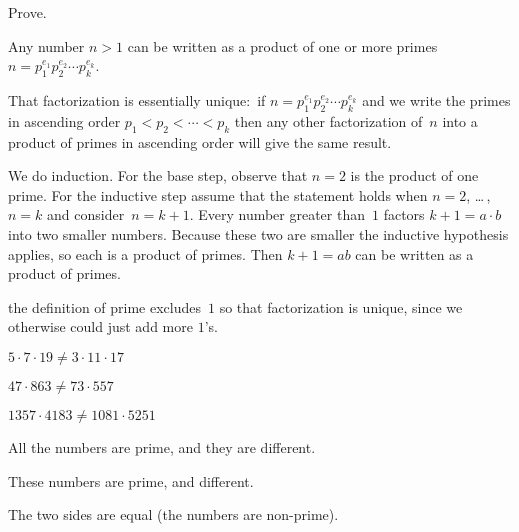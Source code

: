 \documentclass{ibl}
\begin{document}
\begin{ex}  Prove.
\begin{exes}
\item Any number $n>1$ can be written as a product of one or more primes
$n=p_1^{e_1}p_2^{e_2}\cdots p_k^{e_k}$.
\item That factorization is essentially unique:~if 
$n=p_1^{e_1}p_2^{e_2}\cdots p_k^{e_k}$ and we write the primes
in ascending order $p_1<p_2<\cdots<p_k$ then any other
factorization of~$n$ into a product of primes in ascending order will give the
same result.      
\end{exes}
\begin{ans}
\begin{exes}
\item We do induction.
For the base step, observe that $n=2$ is the product of one prime. 
For the inductive step assume that the statement holds when $n=2$, \ldots\,, 
$n=k$ and consider~$n=k+1$.
Every number greater than~$1$ factors $k+1=a\cdot b$ into two smaller
numbers.
Because these two are smaller
the inductive hypothesis applies, so each is a product of 
primes.
Then $k+1=ab$ can be written as a product of primes.
\item
   
\end{exes}
\end{ans}
\end{ex}

\noindent\remark
the definition of prime excludes~$1$ so that factorization is unique, 
since we otherwise could just add more $1$'s.

\begin{ex} \pord
\begin{exes}
\item $5\cdot 7\cdot 19\neq 3\cdot 11\cdot 17$
\item $47\cdot 863\neq 73\cdot 557$
\item $1357\cdot 4183\neq 1081\cdot 5251$ %
\end{exes}
\begin{ans}
\begin{exes}
\item All the numbers are prime, and they are different.
\item These numbers are prime, and different.
\item The two sides are equal (the numbers are non-prime).     
\end{exes}
\end{ans}
\end{ex}
\end{document}
